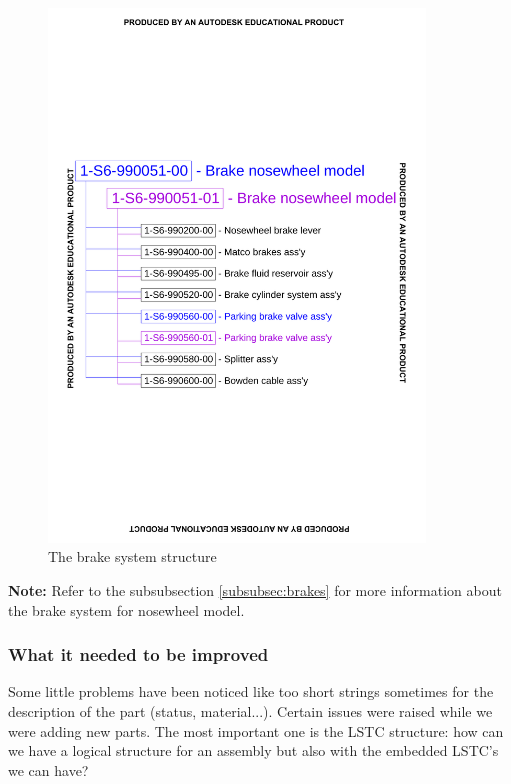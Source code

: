 \documentclass[11pt,a4paper]{article}
\begin{document}
\begin{figure}[ht!]
	\begin{center}
		\includegraphics[width=10cm,trim = 1.5cm 8.5cm 1.5cm 8.5cm, clip]{pics/PIC025.pdf}
		\caption{The brake system structure}
		\label{fig:PIC025}
	\end{center}
\end{figure}

\bigskip

\textbf{Note:} Refer to the subsubsection \ref{subsubsec:brakes} for more information about the brake system for nosewheel model.

\newpage

\subsubsection{What it needed to be improved}
Some little problems have been noticed like too short strings sometimes for the description of the part (status, material...).
Certain issues were raised while we were adding new parts. The most important one is the LSTC structure: how can we have a logical structure for an assembly but also with the embedded LSTC's we can have? %
\end{document}

